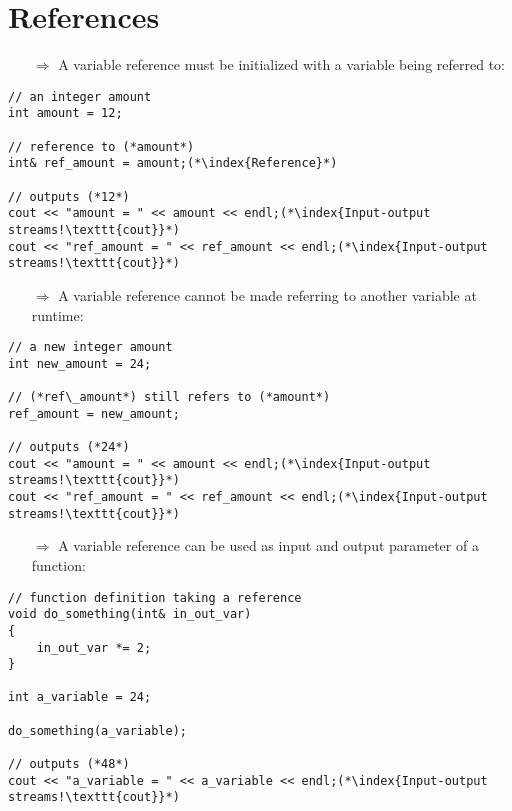\documentclass[10pt]{article}
\begin{document}
\section{References}
\small
\begin{enumerate}
\item[$\Rightarrow$] A variable reference must be initialized with a variable being referred to:
\end{enumerate}
\begin{lstlisting}
// an integer amount
int amount = 12;

// reference to (*amount*)
int& ref_amount = amount;(*\index{Reference}*)

// outputs (*12*)
cout << "amount = " << amount << endl;(*\index{Input-output streams!\texttt{cout}}*)
cout << "ref_amount = " << ref_amount << endl;(*\index{Input-output streams!\texttt{cout}}*)
\end{lstlisting}
\begin{enumerate}
\item[$\Rightarrow$] A variable reference cannot be made referring to another variable at runtime:
\end{enumerate}
\begin{lstlisting}
// a new integer amount
int new_amount = 24;

// (*ref\_amount*) still refers to (*amount*)
ref_amount = new_amount;

// outputs (*24*)
cout << "amount = " << amount << endl;(*\index{Input-output streams!\texttt{cout}}*)
cout << "ref_amount = " << ref_amount << endl;(*\index{Input-output streams!\texttt{cout}}*)
\end{lstlisting}
\begin{enumerate}
\item[$\Rightarrow$] A variable reference can be used as input and output parameter of a function:
\end{enumerate}
\begin{lstlisting}
// function definition taking a reference
void do_something(int& in_out_var)
{
    in_out_var *= 2;
}

int a_variable = 24;

do_something(a_variable);

// outputs (*48*)
cout << "a_variable = " << a_variable << endl;(*\index{Input-output streams!\texttt{cout}}*)
\end{lstlisting}
%
%
\end{document}
